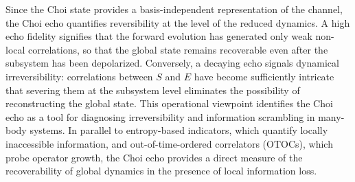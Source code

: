 \documentclass[pra,twocolumn,aps,showpacs,superscriptaddress,longbibliography]{revtex4-2}%
\providecommand{\DIFdelend}{} %
\begin{document}
\DIFdelend Since the Choi state provides a basis-independent representation of the channel, the Choi echo quantifies reversibility at the level of the reduced dynamics. A high echo fidelity signifies that the forward evolution has generated only weak non-local correlations, so that the global state remains recoverable even after the subsystem has been depolarized. Conversely, a decaying echo signals dynamical irreversibility: correlations between \(S\) and \(E\) have become sufficiently intricate that severing them at the subsystem level eliminates the possibility of reconstructing the global state. This operational viewpoint identifies the Choi echo as a tool for diagnosing irreversibility and information scrambling in many-body systems. In parallel to entropy-based indicators, which quantify locally inaccessible information, and out-of-time-ordered correlators (OTOCs), which probe operator growth, the Choi echo provides a direct measure of the recoverability of global dynamics in the presence of local information loss.


\end{document}
